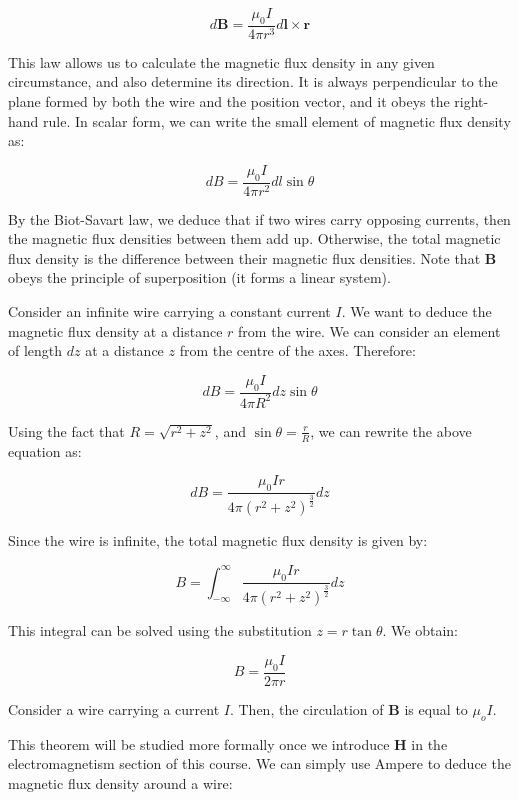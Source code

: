 \documentclass{article}
\begin{document}
\begin{proposition}
\begin{theorem}
    \[ d\mathbf{B} = \frac{\mu_0I}{4\pi r^3} d\mathbf{l} \times \mathbf{r} \]
\end{theorem}

This law allows us to calculate the magnetic flux density in any given circumstance, and also determine its direction. It is always perpendicular to the plane formed by both the wire and the position vector, and it obeys the right-hand rule.
In scalar form, we can write the small element of magnetic flux density as:

\[ dB = \frac{\mu_0I}{4\pi r^2} dl\sin{\theta} \]

By the Biot-Savart law, we deduce that if two wires carry opposing currents, then the magnetic flux densities between them add up. Otherwise, the total magnetic flux density is the difference between their magnetic flux densities. Note that $\mathbf{B}$ obeys the principle of superposition (it forms a linear system).

\begin{example}
    Consider an infinite wire carrying a constant current $I$. We want to deduce the magnetic flux density at a distance $r$ from the wire. We can consider an element of length $dz$ at a distance $z$ from the centre of the axes. Therefore:

    \[ dB = \frac{\mu_0I}{4\pi R^2}dz \sin{\theta} \]

    Using the fact that $R = \sqrt{r^2 + z^2}$, and $\sin{\theta} = \frac{r}{R}$, we can rewrite the above equation as:

    \[ dB = \frac{\mu_0Ir}{4\pi \left(r^2 + z^2\right)^{\frac{3}{2}}}dz \]

    Since the wire is infinite, the total magnetic flux density is given by:

    \[ B = \int_{-\infty}^{\infty} \frac{\mu_0Ir}{4\pi \left(r^2 + z^2\right)^{\frac{3}{2}}}dz \]

    This integral can be solved using the substitution $z = r\tan{\theta}$. We obtain:

    \[ B = \frac{\mu_0I}{2\pi r} \]
\end{example}

\begin{theorem}
    Consider a wire carrying a current $I$. Then, the circulation of $\mathbf{B}$ is equal to $\mu_oI$. 
\end{theorem}

This theorem will be studied more formally once we introduce $\mathbf{H}$ in the electromagnetism section of this course. We can simply use Ampere to deduce the magnetic flux density around a wire:


\end{proposition}
\end{document}

